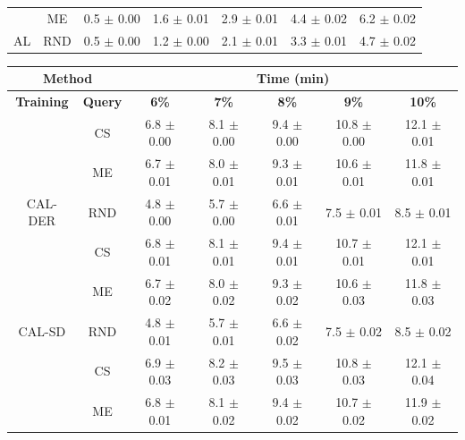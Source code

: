 \begin{table}[htbp]
\begin{tabular*}{\linewidth}{c|c|@{\extracolsep{\fill}}ccccc}
 & ME & 0.5 $\pm$ {\small 0.00} & 1.6 $\pm$ {\small 0.01} & 2.9 $\pm$ {\small 0.01} & 4.4 $\pm$ {\small 0.02} & 6.2 $\pm$ {\small 0.02}\\

\multirow{-3}{*}{\raggedright\arraybackslash AL} & RND & 0.5 $\pm$ {\small 0.00} & 1.2 $\pm$ {\small 0.00} & 2.1 $\pm$ {\small 0.01} & 3.3 $\pm$ {\small 0.01} & 4.7 $\pm$ {\small 0.02}\\
\bottomrule
\end{tabular*}
\vspace{0.5em}

\begin{tabular*}{\linewidth}{c|c|@{\extracolsep{\fill}}ccccc}
\toprule
\multicolumn{2}{c|}{\textbf{Method}} & \multicolumn{5}{c}{\textbf{Time (min)}} \\
\midrule
\textbf{Training} & \textbf{Query} & \textbf{6\%} & \textbf{7\%} & \textbf{8\%} & \textbf{9\%} & \textbf{10\%}\\
\midrule
 & CS & 6.8 $\pm$ {\small 0.00} & 8.1 $\pm$ {\small 0.00} & 9.4 $\pm$ {\small 0.00} & 10.8 $\pm$ {\small 0.00} & 12.1 $\pm$ {\small 0.01}\\

 & ME & 6.7 $\pm$ {\small 0.01} & 8.0 $\pm$ {\small 0.01} & 9.3 $\pm$ {\small 0.01} & 10.6 $\pm$ {\small 0.01} & 11.8 $\pm$ {\small 0.01}\\

\multirow{-3}{*}{\raggedright\arraybackslash CAL-DER} & RND & 4.8 $\pm$ {\small 0.00} & 5.7 $\pm$ {\small 0.00} & 6.6 $\pm$ {\small 0.01} & 7.5 $\pm$ {\small 0.01} & 8.5 $\pm$ {\small 0.01}\\
\midrule
 & CS & 6.8 $\pm$ {\small 0.01} & 8.1 $\pm$ {\small 0.01} & 9.4 $\pm$ {\small 0.01} & 10.7 $\pm$ {\small 0.01} & 12.1 $\pm$ {\small 0.01}\\

 & ME & 6.7 $\pm$ {\small 0.02} & 8.0 $\pm$ {\small 0.02} & 9.3 $\pm$ {\small 0.02} & 10.6 $\pm$ {\small 0.03} & 11.8 $\pm$ {\small 0.03}\\

\multirow{-3}{*}{\raggedright\arraybackslash CAL-SD} & RND & 4.8 $\pm$ {\small 0.01} & 5.7 $\pm$ {\small 0.01} & 6.6 $\pm$ {\small 0.02} & 7.5 $\pm$ {\small 0.02} & 8.5 $\pm$ {\small 0.02}\\
\midrule
 & CS & 6.9 $\pm$ {\small 0.03} & 8.2 $\pm$ {\small 0.03} & 9.5 $\pm$ {\small 0.03} & 10.8 $\pm$ {\small 0.03} & 12.1 $\pm$ {\small 0.04}\\

 & ME & 6.8 $\pm$ {\small 0.01} & 8.1 $\pm$ {\small 0.02} & 9.4 $\pm$ {\small 0.02} & 10.7 $\pm$ {\small 0.02} & 11.9 $\pm$ {\small 0.02}\\


\end{tabular*}
\end{table}
